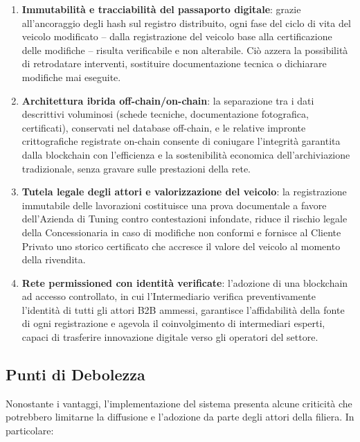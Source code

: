 \begin{enumerate}
    \item \textbf{Immutabilità e tracciabilità del passaporto digitale}: grazie all'ancoraggio degli hash sul registro distribuito, ogni fase del ciclo di vita del veicolo modificato -- dalla registrazione del veicolo base alla certificazione delle modifiche -- risulta verificabile e non alterabile. Ciò azzera la possibilità di retrodatare interventi, sostituire documentazione tecnica o dichiarare modifiche mai eseguite.

    \item \textbf{Architettura ibrida off-chain/on-chain}: la separazione tra i dati descrittivi voluminosi (schede tecniche, documentazione fotografica, certificati), conservati nel database off-chain, e le relative impronte crittografiche registrate on-chain consente di coniugare l'integrità garantita dalla blockchain con l'efficienza e la sostenibilità economica dell'archiviazione tradizionale, senza gravare sulle prestazioni della rete.

    \item \textbf{Tutela legale degli attori e valorizzazione del veicolo}: la registrazione immutabile delle lavorazioni costituisce una prova documentale a favore dell'Azienda di Tuning contro contestazioni infondate, riduce il rischio legale della Concessionaria in caso di modifiche non conformi e fornisce al Cliente Privato uno storico certificato che accresce il valore del veicolo al momento della rivendita.

    \item \textbf{Rete permissioned con identità verificate}: l'adozione di una blockchain ad accesso controllato, in cui l'Intermediario verifica preventivamente l'identità di tutti gli attori B2B ammessi, garantisce l'affidabilità della fonte di ogni registrazione e agevola il coinvolgimento di intermediari esperti, capaci di trasferire innovazione digitale verso gli operatori del settore.
\end{enumerate}

\subsection*{Punti di Debolezza}
Nonostante i vantaggi, l'implementazione del sistema presenta alcune criticità che potrebbero limitarne la diffusione e l'adozione da parte degli attori della filiera. In particolare:

